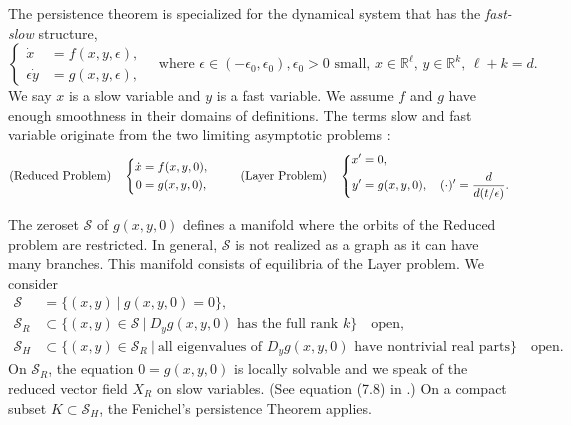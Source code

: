 \documentclass[usletter,11pt]{article}
\theoremstyle{remark}
\begin{document}
The persistence theorem is specialized for the dynamical system that has the {\it fast-slow} structure, 
\begin{equation} \label{eq:fast-slow}
 \left\{
 \begin{aligned}
  \dot{x}&=f(x,y,\epsilon),\\
  \epsilon\dot{y}&=g(x,y,\epsilon),
 \end{aligned}\right. \quad \text{where $\epsilon \in (-\epsilon_0,\epsilon_0), \epsilon_0>0$ small, $x\in \mathbb{R}^\ell$, $y\in \mathbb{R}^k$, $\ell+k=d$.}
\end{equation}
We say $x$ is a slow variable and $y$ is a fast variable. We assume $f$ and $g$ have enough smoothness in their domains of definitions. The terms slow and fast variable originate from
the two limiting asymptotic problems :
\begin{equation*} %
 \text{(Reduced Problem)}\quad\left\{
 \begin{aligned}
    \dot{x} &= f(x,y,0),\\
    0&= g(x,y,0),
 \end{aligned}\right. 
 \hspace{2.5em}
 \text{(Layer Problem)} \quad  
 \left\{
 \begin{aligned}
    x'&= 0,\\
    y'&= g(x,y,0), \quad (\cdot)' = \frac{d}{d(t/\epsilon)}.%
 \end{aligned}\right. 
\end{equation*}

The zeroset $\mathcal{S}$ of $g(x,y,0)$ defines a manifold where the orbits of the Reduced problem are restricted. In general, $\mathcal{S}$ is not realized as a graph as it can have many branches. This manifold consists of equilibria of the Layer problem. We consider 
\begin{align*}
 \mathcal{S}& = \Big\{ (x,y)\:\Big|\: g(x,y,0)=0\Big\},\\
 \mathcal{S}_R&\subset \Big\{ (x,y)\in \mathcal{S} \:\Big|\: \text{$D_y g(x,y,0)$ has the full rank $k$}\Big\} \quad \text{open},\\
 \mathcal{S}_H&\subset \Big\{ (x,y)\in \mathcal{S}_R \:\Big|\: \text{all eigenvalues of $D_y g(x,y,0)$ have nontrivial real parts}\Big\}\quad \text{open}. 
\end{align*}
On $\mathcal{S}_R$, the equation $0=g(x,y,0)$ is locally solvable and we speak of the reduced vector field $X_R$ on slow variables. (See equation (7.8) in \cite{fenichel_geometric_1979}.) On a compact subset $K \subset \mathcal{S}_H$, the Fenichel's persistence Theorem \cite[Theorem 9.1]{fenichel_geometric_1979} applies. 
\end{document}
